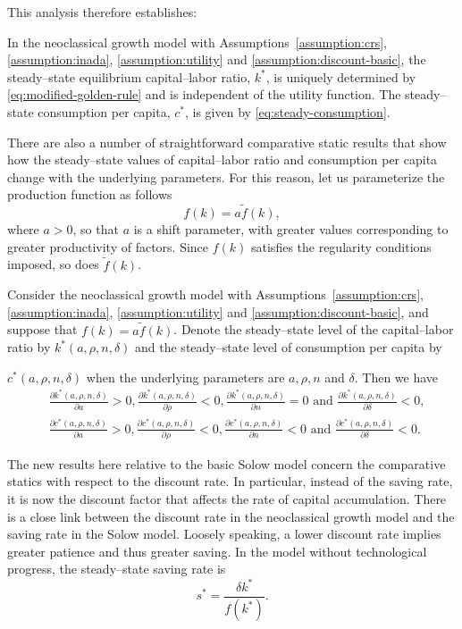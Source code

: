 \documentclass[\topdir/lecture\_notes.tex]{subfiles}
\begin{document}
This analysis therefore establishes:
\begin{proposition}\label{prop:steady--state}
  In the neoclassical growth model with Assumptions~\ref{assumption:crs}, \ref{assumption:inada}, \ref{assumption:utility} and \ref{assumption:discount-basic}, the steady--state equilibrium capital--labor ratio, \(k^*\), is uniquely determined by \eqref{eq:modified-golden-rule} and is independent of the utility function. The steady--state consumption per capita, \(c^*\), is given by \eqref{eq:steady-consumption}.
\end{proposition}

There are also a number of straightforward comparative static results that show how the steady--state values of capital--labor ratio and consumption per capita change with the underlying parameters. For this reason, let us parameterize the production function as follows
\[
  f(k)=a \tilde{f}(k),
\]
where \(a>0\), so that \(a\) is a shift parameter, with greater values corresponding to greater productivity of factors. Since \(f(k)\) satisfies the regularity conditions imposed, so does \(\tilde{f}(k)\).

\begin{proposition}\label{prop:comparative-statics}
  Consider the neoclassical growth model with Assumptions~\ref{assumption:crs}, \ref{assumption:inada}, \ref{assumption:utility} and \ref{assumption:discount-basic}, and suppose that \(f(k)=a \tilde{f}(k)\). Denote the steady--state level of the capital--labor ratio by \(k^*(a, \rho, n, \delta)\) and the steady--state level of consumption per capita by

  \(c^*(a, \rho, n, \delta)\) when the underlying parameters are \(a, \rho, n\) and \(\delta\). Then we have
  \[
    \begin{aligned}
       & \frac{\partial k^{*}(a, \rho, n, \delta)}{\partial a}>0, \frac{\partial k^{*}(a, \rho, n, \delta)}{\partial \rho}<0, \frac{\partial k^{*}(a, \rho, n, \delta)}{\partial n}=0 \text { and } \frac{\partial k^{*}(a, \rho, n, \delta)}{\partial \delta}<0, \\
       & \frac{\partial c^{*}(a, \rho, n, \delta)}{\partial a}>0, \frac{\partial c^{*}(a, \rho, n, \delta)}{\partial \rho}<0, \frac{\partial c^{*}(a, \rho, n, \delta)}{\partial n}<0 \text { and } \frac{\partial c^{*}(a, \rho, n, \delta)}{\partial \delta}<0.
    \end{aligned}
  \]
\end{proposition}

The new results here relative to the basic Solow model concern the comparative statics with respect to the discount rate. In particular, instead of the saving rate, it is now the discount factor that affects the rate of capital accumulation. There is a close link between the discount rate in the neoclassical growth model and the saving rate in the Solow model. Loosely speaking, a lower discount rate implies greater patience and thus greater saving. In the model without technological progress, the steady--state saving rate is
\[
  s^{*}=\frac{\delta k^{*}}{f\left(k^{*}\right)}.
\]
\end{document}
